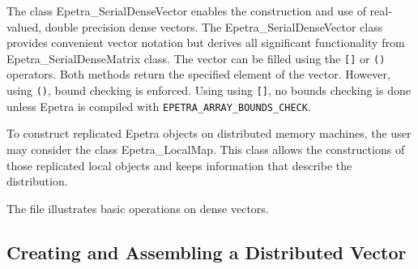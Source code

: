 The class Epetra\_SerialDenseVector enables the construction and use of
real-valued, double precision dense vectors. The
Epetra\_SerialDenseVector class provides convenient vector notation but
derives all significant functionality from Epetra\_SerialDenseMatrix
class.  The vector can be filled using the \verb![]! or \verb!()!
operators.  Both methods return the specified element of the vector.
However, using \verb!()!, bound checking is enforced. Using using
\verb![]!, no bounds checking is done unless Epetra is compiled with
\verb!EPETRA_ARRAY_BOUNDS_CHECK!.

\begin{remark}
  To construct replicated Epetra objects on distributed memory machines,
  the user may consider the class Epetra\_LocalMap. This class allows
  the constructions of those replicated local objects and keeps
  information that describe the distribution.
\end{remark}

The file  illustrates basic operations on dense
vectors.


\subsection{Creating and Assembling a Distributed Vector}
\label{sec:distr_vec}

